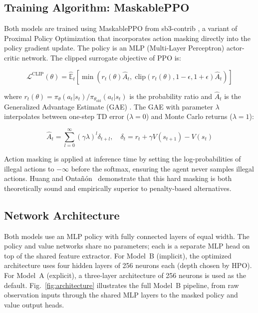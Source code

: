 \documentclass[conference]{IEEEtran}
\begin{document}
\subsection{Training Algorithm: MaskablePPO}

Both models are trained using MaskablePPO from sb3-contrib
\cite{raffin2021stable}, a variant of Proximal Policy Optimization
\cite{schulman2017proximal} that incorporates action masking directly
into the policy gradient update. The policy is an MLP
(Multi-Layer Perceptron) actor-critic network. The clipped
surrogate objective of PPO is:

\begin{equation}
\mathcal{L}^{\text{CLIP}}(\theta) = \hat{\mathbb{E}}_t \left[
  \min\!\left( r_t(\theta)\hat{A}_t,\;
  \text{clip}(r_t(\theta), 1-\epsilon, 1+\epsilon)\hat{A}_t \right)
\right]
\label{eq:ppo}
\end{equation}

where $r_t(\theta) = \pi_\theta(a_t|s_t) / \pi_{\theta_\text{old}}
(a_t|s_t)$ is the probability ratio and $\hat{A}_t$ is the
Generalized Advantage Estimate (GAE) \cite{schulman2016high}. The
GAE with parameter $\lambda$ interpolates between one-step TD error
($\lambda=0$) and Monte Carlo returns ($\lambda=1$):

\begin{equation}
\hat{A}_t = \sum_{l=0}^{\infty} (\gamma\lambda)^l \delta_{t+l},
\quad \delta_t = r_t + \gamma V(s_{t+1}) - V(s_t)
\label{eq:gae}
\end{equation}

Action masking is applied at inference time by setting the
log-probabilities of illegal actions to $-\infty$ before the
softmax, ensuring the agent never samples illegal actions.
Huang and Onta\~{n}{\'o}n~\cite{huang2022closer} demonstrate that
this hard masking is both theoretically sound and empirically
superior to penalty-based alternatives.

\subsection{Network Architecture}

Both models use an MLP policy with fully connected layers of
equal width. The policy and value networks share no parameters;
each is a separate MLP head on top of the shared feature extractor.
For Model~B (implicit), the optimized architecture uses four hidden
layers of 256 neurons each (depth chosen by HPO). For Model~A
(explicit), a three-layer architecture of 256 neurons is used as the
default. Fig.~\ref{fig:architecture} illustrates the full Model~B
pipeline, from raw observation inputs through the shared MLP layers
to the masked policy and value output heads.
\end{document}
